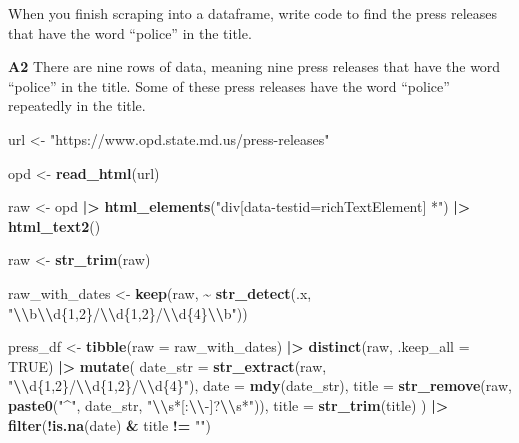 \documentclass[
]{article}
\newenvironment{Shaded}{\begin{snugshade}}{\end{snugshade}}
\newcommand{\AttributeTok}[1]{\textcolor[rgb]{0.13,0.29,0.53}{#1}}
\newcommand{\ConstantTok}[1]{\textcolor[rgb]{0.56,0.35,0.01}{#1}}
\newcommand{\FunctionTok}[1]{\textcolor[rgb]{0.13,0.29,0.53}{\textbf{#1}}}
\newcommand{\NormalTok}[1]{#1}
\newcommand{\OtherTok}[1]{\textcolor[rgb]{0.56,0.35,0.01}{#1}}
\newcommand{\SpecialCharTok}[1]{\textcolor[rgb]{0.81,0.36,0.00}{\textbf{#1}}}
\newcommand{\StringTok}[1]{\textcolor[rgb]{0.31,0.60,0.02}{#1}}
\begin{document}
When you finish scraping into a dataframe, write code to find the press
releases that have the word ``police'' in the title.

\textbf{A2} There are nine rows of data, meaning nine press releases
that have the word ``police'' in the title. Some of these press releases
have the word ``police'' repeatedly in the title.

\begin{Shaded}
\begin{Highlighting}[]
\NormalTok{url }\OtherTok{\textless{}{-}} \StringTok{"https://www.opd.state.md.us/press{-}releases"}


\NormalTok{opd }\OtherTok{\textless{}{-}} \FunctionTok{read\_html}\NormalTok{(url)}


\NormalTok{raw }\OtherTok{\textless{}{-}}\NormalTok{ opd }\SpecialCharTok{|\textgreater{}}
  \FunctionTok{html\_elements}\NormalTok{(}\StringTok{"div[data{-}testid=\textquotesingle{}richTextElement\textquotesingle{}] *"}\NormalTok{) }\SpecialCharTok{|\textgreater{}}
  \FunctionTok{html\_text2}\NormalTok{() }

\NormalTok{raw }\OtherTok{\textless{}{-}} \FunctionTok{str\_trim}\NormalTok{(raw)}

\NormalTok{raw\_with\_dates }\OtherTok{\textless{}{-}} \FunctionTok{keep}\NormalTok{(raw, }\SpecialCharTok{\textasciitilde{}} \FunctionTok{str\_detect}\NormalTok{(.x, }\StringTok{"}\SpecialCharTok{\textbackslash{}\textbackslash{}}\StringTok{b}\SpecialCharTok{\textbackslash{}\textbackslash{}}\StringTok{d\{1,2\}/}\SpecialCharTok{\textbackslash{}\textbackslash{}}\StringTok{d\{1,2\}/}\SpecialCharTok{\textbackslash{}\textbackslash{}}\StringTok{d\{4\}}\SpecialCharTok{\textbackslash{}\textbackslash{}}\StringTok{b"}\NormalTok{))}

\NormalTok{press\_df }\OtherTok{\textless{}{-}} \FunctionTok{tibble}\NormalTok{(}\AttributeTok{raw =}\NormalTok{ raw\_with\_dates) }\SpecialCharTok{|\textgreater{}}
  \FunctionTok{distinct}\NormalTok{(raw, }\AttributeTok{.keep\_all =} \ConstantTok{TRUE}\NormalTok{) }\SpecialCharTok{|\textgreater{}}
  \FunctionTok{mutate}\NormalTok{(}
    \AttributeTok{date\_str =} \FunctionTok{str\_extract}\NormalTok{(raw, }\StringTok{"}\SpecialCharTok{\textbackslash{}\textbackslash{}}\StringTok{d\{1,2\}/}\SpecialCharTok{\textbackslash{}\textbackslash{}}\StringTok{d\{1,2\}/}\SpecialCharTok{\textbackslash{}\textbackslash{}}\StringTok{d\{4\}"}\NormalTok{),}
    \AttributeTok{date =} \FunctionTok{mdy}\NormalTok{(date\_str),}
    \AttributeTok{title =} \FunctionTok{str\_remove}\NormalTok{(raw, }\FunctionTok{paste0}\NormalTok{(}\StringTok{"\^{}"}\NormalTok{, date\_str, }\StringTok{"}\SpecialCharTok{\textbackslash{}\textbackslash{}}\StringTok{s*[:}\SpecialCharTok{\textbackslash{}\textbackslash{}}\StringTok{{-}]?}\SpecialCharTok{\textbackslash{}\textbackslash{}}\StringTok{s*"}\NormalTok{)),}
    \AttributeTok{title =} \FunctionTok{str\_trim}\NormalTok{(title)}
\NormalTok{  ) }\SpecialCharTok{|\textgreater{}}
  \FunctionTok{filter}\NormalTok{(}\SpecialCharTok{!}\FunctionTok{is.na}\NormalTok{(date) }\SpecialCharTok{\&}\NormalTok{ title }\SpecialCharTok{!=} \StringTok{""}\NormalTok{)}


\end{Highlighting}
\end{Shaded}
\end{document}
